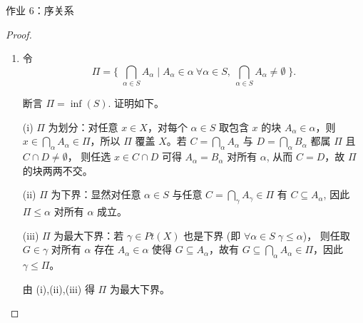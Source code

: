 \begin{frame}[allowframebreaks]{作业 6：序关系}
\begin{proof}
\begin{enumerate}[(1)]
      由 (i),(ii) 得 $P$ 为最小上界。

    \item[下确界]
      令
      \[\Pi=\Big\{\;\bigcap_{\alpha\in S}A_{\alpha}\;\Big|\;A_{\alpha}\in\alpha\ \forall\alpha\in S,\ \bigcap_{\alpha\in S}A_{\alpha}\neq\emptyset\;\Big\}.
      \]

      断言 $\Pi=\inf(S)$. 证明如下。

      (i) $\Pi$ 为划分：对任意 $x\in X$，对每个 $\alpha\in S$ 取包含 $x$ 的块 $A_{\alpha}\in\alpha$，则
      $x\in\bigcap_{\alpha}A_{\alpha}\in\Pi$，所以 $\Pi$ 覆盖 $X$。若
      $C=\bigcap_{\alpha}A_{\alpha}$ 与 $D=\bigcap_{\alpha}B_{\alpha}$ 都属 $\Pi$ 且 $C\cap D\neq\emptyset$，
      则任选 $x\in C\cap D$ 可得 $A_{\alpha}=B_{\alpha}$ 对所有 $\alpha$, 从而 $C=D$，故 $\Pi$ 的块两两不交。

      (ii) $\Pi$ 为下界：显然对任意 $\alpha\in S$ 与任意 $C=\bigcap_{\gamma}A_{\gamma}\in\Pi$ 有 $C\subseteq A_{\alpha}$,
      因此 $\Pi\le\alpha$ 对所有 $\alpha$ 成立。

      (iii) $\Pi$ 为最大下界：若 $\gamma\in Pt(X)$ 也是下界 (即 $\forall\alpha\in S\;\gamma\le\alpha$)，
      则任取 $G\in\gamma$ 对所有 $\alpha$ 存在 $A_{\alpha}\in\alpha$ 使得 $G\subseteq A_{\alpha}$，故有
      $G\subseteq\bigcap_{\alpha}A_{\alpha}\in\Pi$，因此 $\gamma\le\Pi$。

      由 (i),(ii),(iii) 得 $\Pi$ 为最大下界。
\end{enumerate}
\end{proof}

\end{frame}
